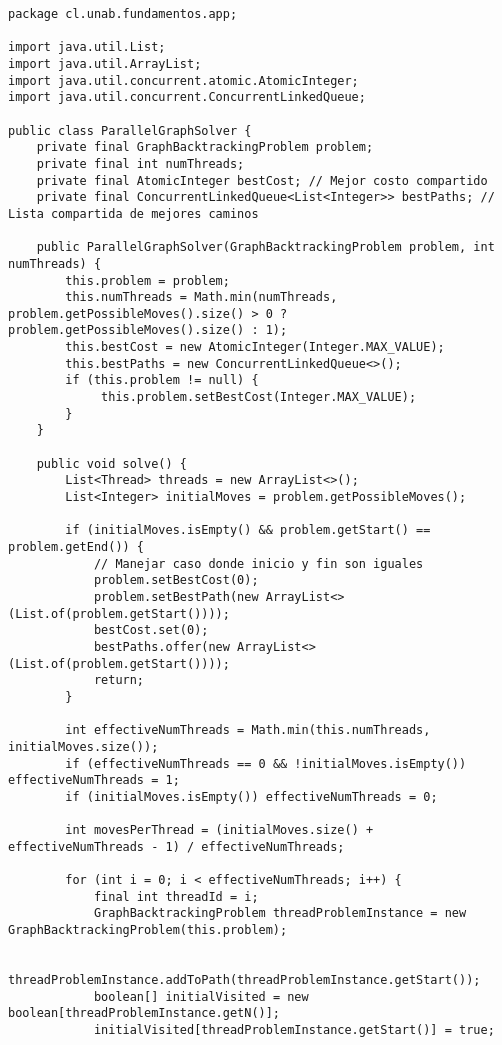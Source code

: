 \documentclass[12pt]{article}
\begin{document}
\begin{lstlisting}[caption={Implementación Paralela con Threads en Java (`ParallelGraphSolver.java`)}]
package cl.unab.fundamentos.app;

import java.util.List;
import java.util.ArrayList;
import java.util.concurrent.atomic.AtomicInteger;
import java.util.concurrent.ConcurrentLinkedQueue;

public class ParallelGraphSolver {
    private final GraphBacktrackingProblem problem;
    private final int numThreads;
    private final AtomicInteger bestCost; // Mejor costo compartido
    private final ConcurrentLinkedQueue<List<Integer>> bestPaths; // Lista compartida de mejores caminos

    public ParallelGraphSolver(GraphBacktrackingProblem problem, int numThreads) {
        this.problem = problem;
        this.numThreads = Math.min(numThreads, problem.getPossibleMoves().size() > 0 ? problem.getPossibleMoves().size() : 1);
        this.bestCost = new AtomicInteger(Integer.MAX_VALUE);
        this.bestPaths = new ConcurrentLinkedQueue<>();
        if (this.problem != null) {
             this.problem.setBestCost(Integer.MAX_VALUE);
        }
    }

    public void solve() {
        List<Thread> threads = new ArrayList<>();
        List<Integer> initialMoves = problem.getPossibleMoves(); 

        if (initialMoves.isEmpty() && problem.getStart() == problem.getEnd()) {
            // Manejar caso donde inicio y fin son iguales
            problem.setBestCost(0);
            problem.setBestPath(new ArrayList<>(List.of(problem.getStart())));
            bestCost.set(0);
            bestPaths.offer(new ArrayList<>(List.of(problem.getStart())));
            return;
        }
        
        int effectiveNumThreads = Math.min(this.numThreads, initialMoves.size());
        if (effectiveNumThreads == 0 && !initialMoves.isEmpty()) effectiveNumThreads = 1;
        if (initialMoves.isEmpty()) effectiveNumThreads = 0;

        int movesPerThread = (initialMoves.size() + effectiveNumThreads - 1) / effectiveNumThreads;

        for (int i = 0; i < effectiveNumThreads; i++) {
            final int threadId = i;
            GraphBacktrackingProblem threadProblemInstance = new GraphBacktrackingProblem(this.problem);
            
            threadProblemInstance.addToPath(threadProblemInstance.getStart());
            boolean[] initialVisited = new boolean[threadProblemInstance.getN()];
            initialVisited[threadProblemInstance.getStart()] = true;


\end{lstlisting}
\end{document}
